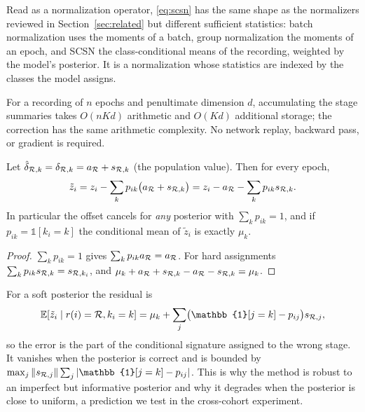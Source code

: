 Read as a normalization operator, \eqref{eq:scsn} has the same shape as the
normalizers reviewed in Section~\ref{sec:related} but different sufficient
statistics: batch normalization uses the moments of a batch, group
normalization the moments of an epoch, and SCSN the class-conditional means of
the recording, weighted by the model's posterior. It is a normalization whose
statistics are indexed by the classes the model assigns.

For a recording of $n$ epochs and penultimate dimension $d$, accumulating the
stage summaries takes $O(nKd)$ arithmetic and $O(Kd)$ additional storage; the
correction has the same arithmetic complexity. No network replay, backward
pass, or gradient is required.

\begin{proposition}
\label{prop:conditional}
Let $\hat\delta_{\mathcal{R},k}=\delta_{\mathcal{R},k}=a_{\mathcal{R}}+s_{\mathcal{R},k}$ (the population
value). Then for every epoch,
\begin{equation}
  \tilde z_i
  = z_i-\sum_k p_{ik}\bigl(a_{\mathcal{R}}+s_{\mathcal{R},k}\bigr)
  = z_i-a_{\mathcal{R}}-\sum_k p_{ik}s_{\mathcal{R},k} .
  \label{eq:cond-exact}
\end{equation}
In particular the offset cancels for \emph{any} posterior with
$\sum_k p_{ik}=1$, and if $p_{ik}=\mathbb{1}[k_i=k]$ the conditional mean of
$\tilde z_i$ is exactly $\mu_k$.
\end{proposition}
\begin{proof}
$\sum_k p_{ik}=1$ gives $\sum_k p_{ik}a_{\mathcal{R}}=a_{\mathcal{R}}$. For hard assignments
$\sum_k p_{ik}s_{\mathcal{R},k}=s_{\mathcal{R},k_i}$, and $\mu_k+a_{\mathcal{R}}+s_{\mathcal{R},k}-a_{\mathcal{R}}
-s_{\mathcal{R},k}=\mu_k$.
\end{proof}

For a soft posterior the residual is
\begin{equation}
  \bE[\tilde z_i\mid r(i)=\cR,k_i=k]
  =\mu_k+\sum_j\bigl(\mathbb{1}[j=k]-p_{ij}\bigr)s_{\cR,j},
  \label{eq:soft-residual}
\end{equation}
so the error is the part of the conditional signature assigned to the wrong
stage. It vanishes when the posterior is correct and is bounded by
$\max_j\|s_{\cR,j}\|\sum_j|\mathbb{1}[j=k]-p_{ij}|$. This is why the method is
robust to an imperfect but informative posterior and why it degrades when the
posterior is close to uniform, a prediction we test in the cross-cohort
experiment.

